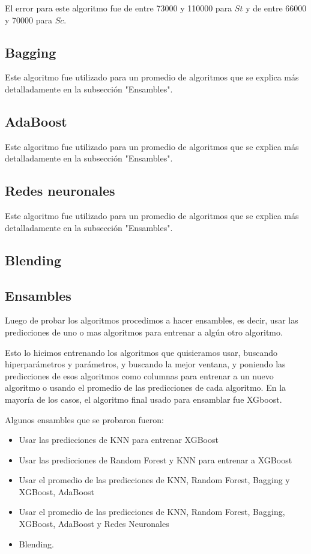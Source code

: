 \documentclass{article}
\begin{document}
El error para este algoritmo fue de entre 73000 y 110000 para $St$ y de entre 66000 y 70000 para $Sc$.

\subsection{Bagging}
Este algoritmo fue utilizado para un promedio de algoritmos que se explica más detalladamente en la subsección "Ensambles".

\subsection{AdaBoost}
Este algoritmo fue utilizado para un promedio de algoritmos que se explica más detalladamente en la subsección "Ensambles".

\subsection{Redes neuronales}
Este algoritmo fue utilizado para un promedio de algoritmos que se explica más detalladamente en la subsección "Ensambles".

\subsection{Blending}

\subsection{Ensambles}
Luego de probar los algoritmos procedimos a hacer ensambles, es decir, usar las predicciones de uno o mas algoritmos para entrenar a algún otro algoritmo.

Esto lo hicimos entrenando los algoritmos que quisieramos usar, buscando hiperparámetros y parámetros, y buscando la mejor ventana, y poniendo las predicciones de esos algoritmos como columnas para entrenar a un nuevo algoritmo o usando el promedio de las predicciones de cada algoritmo.
En la mayoría de los casos, el algoritmo final usado para ensamblar fue XGboost.

Algunos ensambles que se probaron fueron:
\begin{itemize}
    \item Usar las predicciones de KNN para entrenar XGBoost
    \item Usar las predicciones de Random Forest y KNN para entrenar a XGBoost
    \item Usar el promedio de las predicciones de KNN, Random Forest, Bagging y XGBoost, AdaBoost
    \item Usar el promedio de las predicciones de KNN, Random Forest, Bagging, XGBoost, AdaBoost y Redes Neuronales
    \item Blending.
\end{itemize}
\end{document}
